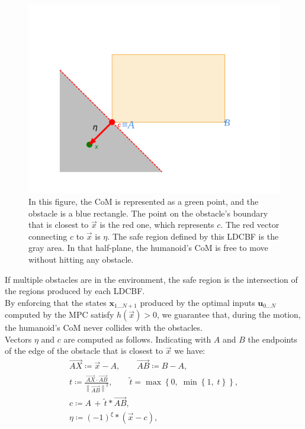 \begin{figure}[h]
    \centering
    \includegraphics[width=0.75\linewidth]{figures//MPC/example_lcbf2.pdf}
    \caption{In this figure, the CoM is represented as a green point, and the obstacle is a blue rectangle. The point on the obstacle's boundary that is closest to $\vec{x}$ is the red one, which represents $c$. The red vector connecting $c$ to $\vec{x}$ is $\eta$. The safe region defined by this LDCBF is the gray area. In that half-plane, the humanoid's CoM is free to move without hitting any obstacle.}
    \label{fig:example_LDCBF}
\end{figure}

If multiple obstacles are in the environment, the safe region is the intersection of the regions produced by each LDCBF.\\
By enforcing that the states $\mathbf{x}_{1...N+1}$ produced by the optimal inputs $\mathbf{u}_{0...N}$ computed by the MPC satisfy $h(\vec{x})>0$, we guarantee that, during the motion, the humanoid's CoM never collides with the obstacles.\\

Vectors $\eta$ and $c$ are computed as follows. Indicating with $A$ and $B$ the endpoints of the edge of the obstacle that is closest to $\vec{x}$ we have:
\begin{gather*}
    \overrightarrow{AX} \coloneqq \vec{x} - A, \qquad \overrightarrow{AB} \coloneqq B - A, \\
    t \coloneqq \frac{\overrightarrow{AX} \cdot \overrightarrow{AB}}{\left\lVert \overrightarrow{AB} \right\rVert ^2}, \qquad \tilde{t} = \max \left\{0,\; \min \left\{ 1,\; t\right\}\right\}, \\
    c \coloneqq A\, +\, \tilde{t}*\overrightarrow{AB}, \\
    \eta \coloneqq \left(-1\right)^{\xi} * \left( \vec{x} - c \right),
\end{gather*}

